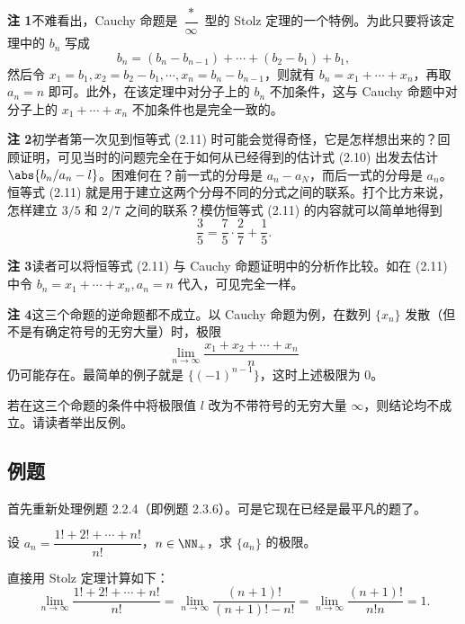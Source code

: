 \begin{xremark}
\textbf{注 1}\quad 不难看出，Cauchy 命题是 $\dfrac*\infty$ 型的 Stolz 定理的一个特例。为此只要将该定理中的 $b_n$ 写成
\[
  b_n=(b_n-b_{n-1})+\cdots+(b_2-b_1)+b_1,
\]
然后令 $x_1=b_1,x_2=b_2-b_1,\cdots,x_n=b_n-b_{n-1}$，则就有 $b_n=x_1+\cdots+x_n$，再取 $a_n=n$ 即可。此外，在该定理中对分子上的 $b_n$ 不加条件，这与 Cauchy 命题中对分子上的 $x_1+\cdots+x_n$ 不加条件也是完全一致的。

\textbf{注 2}\quad 初学者第一次见到恒等式 (2.11) 时可能会觉得奇怪，它是怎样想出来的？回顾证明，可见当时的问题完全在于如何从已经得到的估计式 (2.10) 出发去估计 $\abs{b_n/a_n-l}$。困难何在？前一式的分母是 $a_n-a_N$，而后一式的分母是 $a_n$。恒等式 (2.11) 就是用于建立这两个分母不同的分式之间的联系。打个比方来说，怎样建立 $3/5$ 和 $2/7$ 之间的联系？模仿恒等式 (2.11) 的内容就可以简单地得到
\[
  \frac35=\frac75\cdot\frac27+\frac15.
\]

\textbf{注 3}\quad 读者可以将恒等式 (2.11) 与 Cauchy 命题证明中的分析作比较。如在 (2.11) 中令 $b_n=x_1+\cdots+x_n,a_n=n$ 代入，可见完全一样。

\textbf{注 4}\quad 这三个命题的逆命题都不成立。以 Cauchy 命题为例，在数列 $\{x_n\}$ 发散（但不是有确定符号的无穷大量）时，极限
\[
  \lim_{n\to\infty}\frac{x_1+x_2+\cdots+x_n}{n}
\]
仍可能存在。最简单的例子就是 $\{(-1)^{n-1}\}$，这时上述极限为 0。
\end{xremark}

\begin{xthought}
若在这三个命题的条件中将极限值 $l$ 改为不带符号的无穷大量 $\infty$，则结论均不成立。请读者举出反例。
\end{xthought}

\subsection{例题}

首先重新处理例题 2.2.4（即例题 2.3.6）。可是它现在已经是最平凡的题了。

\begin{xexample}[2.4.1]
设 $a_n=\dfrac{1!+2!+\cdots+n!}{n!}$，$n\in\NN_+$，求 $\{a_n\}$ 的极限。
\end{xexample}
\begin{xsolution}
直接用 Stolz 定理计算如下：
\[
  \lim_{n\to\infty}\frac{1!+2!+\cdots+n!}{n!}
  =\lim_{n\to\infty}\frac{(n+1)!}{(n+1)!-n!}
  =\lim_{n\to\infty}\frac{(n+1)!}{n!n}=1.
\]
\end{xsolution}

